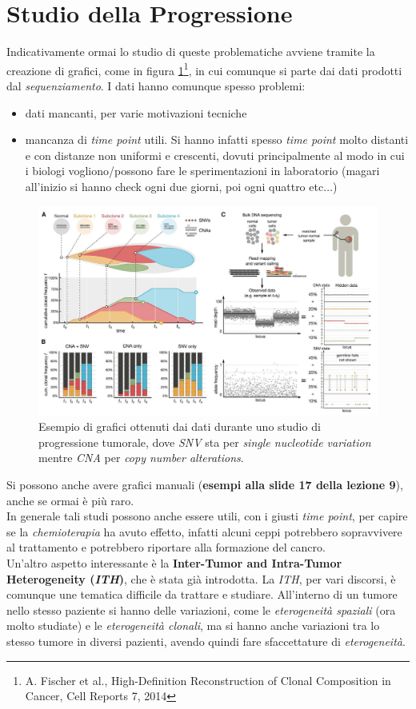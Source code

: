 \documentclass[a4paper,12pt, oneside]{book}
\begin{document}
\section{Studio della Progressione}
Indicativamente ormai lo studio di queste problematiche avviene tramite la
creazione di grafici, come in figura \ref{fig:gra1}\footnote{A. Fischer et al.,
  High-Definition Reconstruction of Clonal Composition in Cancer, Cell Reports
  7, 2014}, in cui
comunque si parte dai dati prodotti dal \textit{sequenziamento}. I dati hanno
comunque spesso problemi:
\begin{itemize}
  \item dati mancanti, per varie motivazioni tecniche
  \item mancanza di \textit{time point} utili. Si hanno infatti spesso
  \textit{time point} molto distanti e con distanze non uniformi e crescenti,
  dovuti principalmente al modo in cui i biologi vogliono/possono fare le
  sperimentazioni in laboratorio (magari all'inizio si hanno check ogni due
  giorni, poi ogni quattro etc$\ldots$)
\end{itemize}
\begin{figure}
  \centering
  \includegraphics[scale = 0.28]{img/gra1.jpg}
  \caption{Esempio di grafici ottenuti dai dati durante uno studio di
    progressione tumorale, dove \textit{SNV} sta per \textit{single nucleotide
      variation} mentre \textit{CNA} per \textit{copy number alterations}.}
  \label{fig:gra1}
\end{figure}
Si possono anche avere grafici manuali (\textbf{esempi alla slide 17 della
  lezione 9}), anche se ormai è più raro. \\
In generale tali studi possono anche essere utili, con i giusti \textit{time
  point}, per capire se la \textit{chemioterapia} ha avuto effetto, infatti
alcuni ceppi potrebbero sopravvivere al trattamento e potrebbero riportare alla
formazione del cancro. \\
Un'altro aspetto interessante è la \textbf{Inter-Tumor and Intra-Tumor
  Heterogeneity (\textit{ITH})}, che è stata già introdotta. La \textit{ITH},
per vari discorsi, è comunque une tematica difficile da trattare e
studiare. All'interno di un tumore nello stesso paziente si hanno delle
variazioni, come le \textit{eterogeneità spaziali} (ora molto studiate) e le
\textit{eterogeneità clonali}, ma si hanno anche
variazioni tra lo stesso tumore in diversi pazienti, avendo quindi fare
sfaccettature di \textit{eterogeneità}.  
\end{document}
